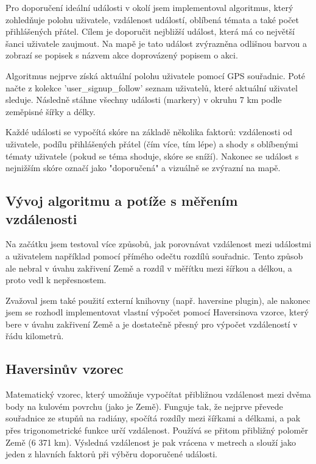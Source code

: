 Pro doporučení ideální události v okolí jsem implementoval algoritmus, který zohledňuje polohu uživatele, vzdálenost událostí, oblíbená témata a také počet přihlášených přátel. Cílem je doporučit nejbližší událost, která má co největší šanci uživatele zaujmout. Na mapě je tato událost zvýrazněna odlišnou barvou a zobrazí se popisek s názvem akce doprovázený popisem o akci.

Algoritmus nejprve získá aktuální polohu uživatele pomocí GPS souřadnic. Poté načte z kolekce 'user\_signup\_follow' seznam uživatelů, které aktuální uživatel sleduje. Následně stáhne všechny události (markery) v okruhu 7 km podle zeměpisné šířky a délky.

Každé události se vypočítá skóre na základě několika faktorů: vzdálenosti od uživatele, podílu přihlášených přátel (čím více, tím lépe) a shody s oblíbenými tématy uživatele (pokud se téma shoduje, skóre se sníží). Nakonec se událost s nejnižším skóre označí jako "doporučená" a vizuálně se zvýrazní na mapě.





\subsection{Vývoj algoritmu a potíže s měřením vzdálenosti}

Na začátku jsem testoval více způsobů, jak porovnávat vzdálenost mezi událostmi a uživatelem například pomocí přímého odečtu rozdílů souřadnic. Tento způsob ale nebral v úvahu zakřivení Země a rozdíl v měřítku mezi šířkou a délkou, a proto vedl k nepřesnostem.

Zvažoval jsem také použití externí knihovny (např. haversine plugin), ale nakonec jsem se rozhodl implementovat vlastní výpočet pomocí Haversinova vzorce, který bere v úvahu zakřivení Země a je dostatečně přesný pro výpočet vzdáleností v řádu kilometrů.
\cite{ChatGPTHelp}



\subsection*{Haversinův vzorec}
Matematický vzorec, který umožňuje vypočítat přibližnou vzdálenost mezi dvěma body na kulovém povrchu (jako je Země). Funguje tak, že nejprve převede souřadnice ze stupňů na radiány, spočítá rozdíly mezi šířkami a délkami, a pak přes trigonometrické funkce určí vzdálenost. Používá se přitom přibližný poloměr Země (6 371 km). Výsledná vzdálenost je pak vrácena v metrech a slouží jako jeden z hlavních faktorů při výběru doporučené události.

